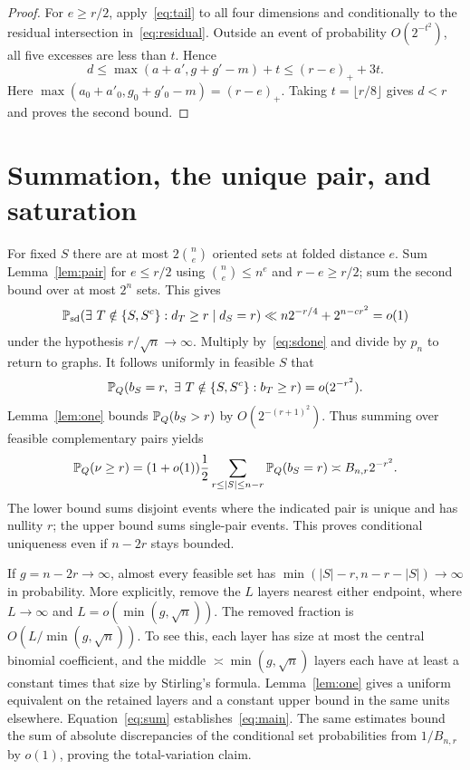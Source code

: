 \documentclass[11pt,letterpaper]{article}
\begin{document}
\begin{proof}
For $e\ge r/2$, apply~\eqref{eq:tail} to all four dimensions and conditionally to the residual intersection in~\eqref{eq:residual}. Outside an event of probability $O(2^{-t^2})$, all five excesses are less than $t$. Hence
\[
 d\le\max(a+a',g+g'-m)+t\le (r-e)_++3t.
\]
Here $\max(a_0+a'_0,g_0+g'_0-m)=(r-e)_+$. Taking $t=\lfloor r/8\rfloor$ gives $d<r$ and proves the second bound.
\end{proof}

\section{Summation, the unique pair, and saturation}
For fixed $S$ there are at most $2\binom ne$ oriented sets at folded distance $e$. Sum Lemma~\ref{lem:pair} for $e\le r/2$ using $\binom ne\le n^e$ and $r-e\ge r/2$; sum the second bound over at most $2^n$ sets. This gives
\[
 \PP_{\rm sd}(\exists\ T\notin\{S,S^c\}:d_T\ge r\mid d_S=r)
 \ll n2^{-r/4}+2^{n-cr^2}=o(1)
\]
under the hypothesis $r/\sqrt n\to\infty$. Multiply by~\eqref{eq:sdone} and divide by $p_n$ to return to graphs. It follows uniformly in feasible $S$ that
\[
 \PP_Q(b_S=r,\ \exists\ T\notin\{S,S^c\}:b_T\ge r)=o(2^{-r^2}).
\]
Lemma~\ref{lem:one} bounds $\mathbb P_Q(b_S>r)$ by $O(2^{-(r+1)^2})$. Thus summing over feasible complementary pairs yields
\begin{equation}\label{eq:sum}
 \mathbb P_Q(\nu\ge r)=(1+o(1))\frac12\sum_{r\le |S|\le n-r}\mathbb P_Q(b_S=r)
             \asymp B_{n,r}2^{-r^2}.
\end{equation}
The lower bound sums disjoint events where the indicated pair is unique and has nullity $r$; the upper bound sums single-pair events. This proves conditional uniqueness even if $n-2r$ stays bounded.

If $g=n-2r\to\infty$, almost every feasible set has $\min(|S|-r,n-r-|S|)\to\infty$ in probability. More explicitly, remove the $L$ layers nearest either endpoint, where $L\to\infty$ and $L=o(\min(g,\sqrt n))$. The removed fraction is $O(L/\min(g,\sqrt n))$. To see this, each layer has size at most the central binomial coefficient, and the middle $\asymp\min(g,\sqrt n)$ layers each have at least a constant times that size by Stirling's formula. Lemma~\ref{lem:one} gives a uniform equivalent on the retained layers and a constant upper bound in the same units elsewhere. Equation~\eqref{eq:sum} establishes~\eqref{eq:main}. The same estimates bound the sum of absolute discrepancies of the conditional set probabilities from $1/B_{n,r}$ by $o(1)$, proving the total-variation claim.
\end{document}
